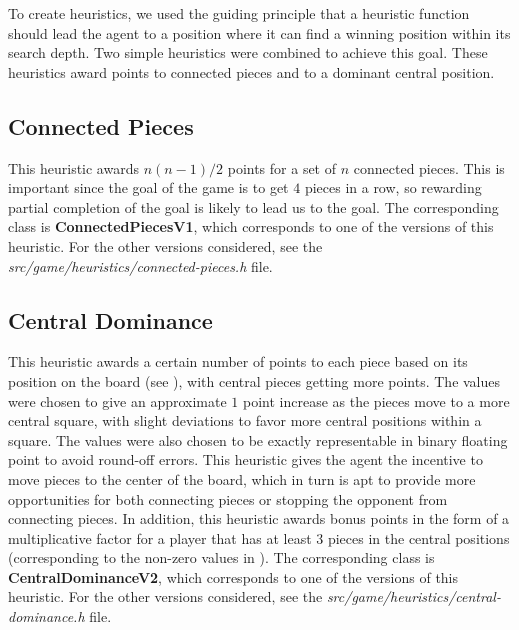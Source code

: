 \documentclass[journal,hidelinks]{IEEEtran}
\begin{document}
To create heuristics, we used the guiding principle that a heuristic function should lead the agent to a position where it can find a winning position within its search depth. Two simple heuristics were combined to achieve this goal. These heuristics award points to connected pieces and to a dominant central position.

\subsection{Connected Pieces}

This heuristic awards $n(n-1)/2$ points for a set of $n$ connected pieces. This is important since the goal of the game is to get $4$ pieces in a row, so rewarding partial completion of the goal is likely to lead us to the goal. The corresponding class is \textbf{ConnectedPiecesV1}, which corresponds to one of the versions of this heuristic. For the other versions considered, see the \textit{src/game/heuristics/connected-pieces.h} file.

\subsection{Central Dominance}

This heuristic awards a certain number of points to each piece based on its position on the board (see ), with central pieces getting more points. The values were chosen to give an approximate $1$ point increase as the pieces move to a more central square, with slight deviations to favor more central positions within a square. The values were also chosen to be exactly representable in binary floating point to avoid round-off errors. This heuristic gives the agent the incentive to move pieces to the center of the board, which in turn is apt to provide more opportunities for both connecting pieces or stopping the opponent from connecting pieces. In addition, this heuristic awards bonus points in the form of a multiplicative factor for a player that has at least $3$ pieces in the central positions (corresponding to the non-zero values in ). The corresponding class is \textbf{CentralDominanceV2}, which corresponds to one of the versions of this heuristic. For the other versions considered, see the \textit{src/game/heuristics/central-dominance.h} file.
\end{document}
